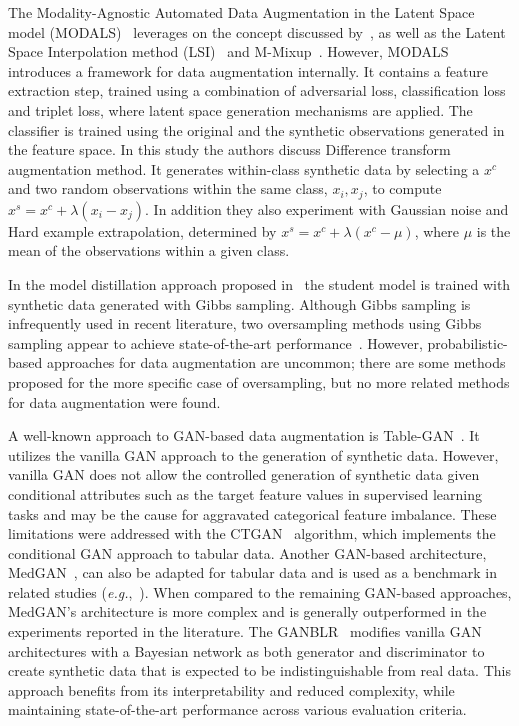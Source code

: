 \documentclass[parskip=full]{scrartcl}
\begin{document}
The Modality-Agnostic Automated Data Augmentation in the Latent Space model
(MODALS)~\cite{cheung2020modals} leverages on the concept discussed
by~\citet{devries2017dataset}, as well as the Latent Space Interpolation
method (LSI)~\cite{liu2018data} and M-Mixup~\cite{verma2019manifold}.
However, MODALS introduces a framework for data augmentation internally. It
contains a feature extraction step, trained using a combination of adversarial
loss, classification loss and triplet loss, where latent space generation
mechanisms are applied. The classifier is trained using the original and the
synthetic observations generated in the feature space. In this study the
authors discuss Difference transform augmentation method. It generates
within-class synthetic data by selecting a $x^c$ and two random observations
within the same class, $x_i, x_j$, to compute $x^s = x^c + \lambda (x_i-x_j)$.
In addition they also experiment with Gaussian noise and Hard example
extrapolation, determined by $x^s = x^c + \lambda (x^c-\mu)$, where $\mu$ is
the mean of the observations within a given class.

In the model distillation approach proposed in~\cite{fakoor2020fast} the
student model is trained with synthetic data generated with Gibbs sampling.
Although Gibbs sampling is infrequently used in recent literature, two
oversampling methods using Gibbs sampling appear to achieve state-of-the-art
performance~\cite{das2014racog}. However, probabilistic-based approaches for
data augmentation are uncommon; there are some methods proposed for the more
specific case of oversampling, but no more related methods for data
augmentation were found.

A well-known approach to GAN-based data augmentation is
Table-GAN~\cite{park2018data}. It utilizes the vanilla GAN approach to the
generation of synthetic data. However, vanilla GAN does not allow the
controlled generation of synthetic data given conditional attributes such as
the target feature values in supervised learning tasks and may be the cause
for aggravated categorical feature imbalance. These limitations were addressed
with the CTGAN~\cite{xu2019modeling} algorithm, which implements the
conditional GAN approach to tabular data. Another GAN-based architecture,
MedGAN~\cite{armanious2020medgan}, can also be adapted for tabular data and is
used as a benchmark in related studies (\textit{e.g.},~\cite{xu2019modeling,
zhang2021ganblr}). When compared to the remaining GAN-based approaches,
MedGAN's architecture is more complex and is generally outperformed in the
experiments reported in the literature. The GANBLR~\cite{zhang2021ganblr}
modifies vanilla GAN architectures with a Bayesian network as both generator
and discriminator to create synthetic data that is expected to be
indistinguishable from real data. This approach benefits from its
interpretability and reduced complexity, while maintaining state-of-the-art
performance across various evaluation criteria.
\end{document}
